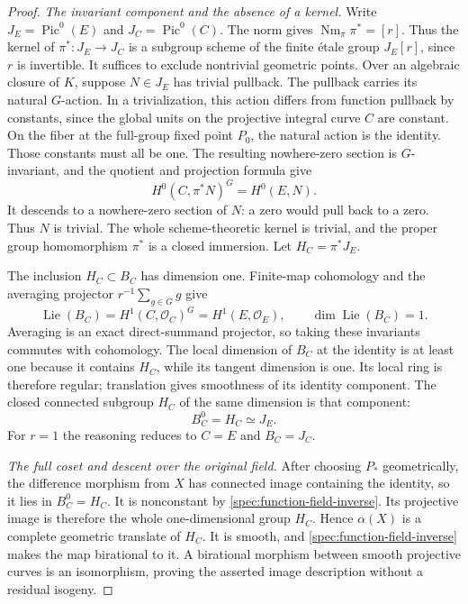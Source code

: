 \begin{proof}
\emph{The invariant component and the absence of a kernel.}
Write $J_E=\operatorname{Pic}^0(E)$ and $J_C=\operatorname{Pic}^0(C)$.
The norm gives $\operatorname{Nm}_{\pi}\pi^*=[r]$.  Thus the kernel
of $\pi^*:J_E\to J_C$ is a subgroup scheme of the finite \'{e}tale
group $J_E[r]$, since $r$ is invertible.  It suffices to exclude
nontrivial geometric points.  Over an algebraic closure of $K$,
suppose $N\in J_E$ has trivial pullback.  The pullback carries its
natural $G$-action.  In a trivialization, this action differs from
function pullback by constants, since the global units on the
projective integral curve $C$ are constant.  On the fiber at the
full-group fixed point $P_0$, the natural action is the identity.
Those constants must all be one.  The resulting nowhere-zero
section is $G$-invariant, and the quotient and projection formula
give
\[
H^0(C,\pi^*N)^G=H^0(E,N).
\]
It descends to a nowhere-zero section of $N$: a zero would pull
back to a zero.  Thus $N$ is trivial.  The whole scheme-theoretic
kernel is trivial, and the proper group homomorphism $\pi^*$ is a
closed immersion.  Let $H_C=\pi^*J_E$.

The inclusion $H_C\subset B_C$ has dimension one.  Finite-map
cohomology and the averaging projector $r^{-1}\sum_{g\in G}g$
give
\[
\operatorname{Lie}(B_C)=H^1(C,\mathcal O_C)^G
                       =H^1(E,\mathcal O_E),
\qquad \dim\operatorname{Lie}(B_C)=1.
\]
Averaging is an exact direct-summand projector, so taking these
invariants commutes with cohomology.  The local dimension of $B_C$
at the identity is at least one because it contains $H_C$, while
its tangent dimension is one.  Its local ring is therefore regular;
translation gives smoothness of its identity component.
The closed connected subgroup $H_C$ of the same dimension is
that component:
\begin{equation}
B_C^0=H_C\simeq J_E.
\label{spec:invariant-component}
\end{equation}
For $r=1$ the reasoning reduces to $C=E$ and $B_C=J_C$.

\emph{The full coset and descent over the original field.}
After choosing $P_*$ geometrically, the difference morphism from
$X$ has connected image containing the identity, so it lies in
$B_C^0=H_C$.  It is nonconstant by
\eqref{spec:function-field-inverse}.  Its projective image is
therefore the whole one-dimensional group $H_C$.
Hence $\alpha(X)$ is a complete geometric translate of $H_C$.
It is smooth, and \eqref{spec:function-field-inverse} makes the
map birational to it.  A birational morphism between smooth
projective curves is an isomorphism, proving the asserted image
description without a residual isogeny.


\end{proof}
